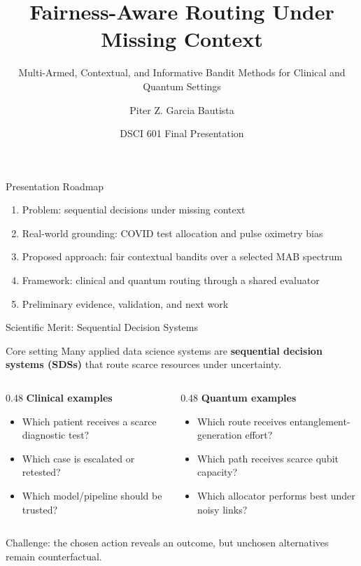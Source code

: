 \documentclass[aspectratio=169,10pt]{beamer}
\title[Fairness-Aware Routing]{Fairness-Aware Routing Under Missing Context}
\subtitle{Multi-Armed, Contextual, and Informative Bandit Methods for Clinical and Quantum Settings}
\author[P. Z. Garcia]{Piter Z. Garcia Bautista}
\institute[RIT]{Rochester Institute of Technology\\MS Data Science / Decision-Making \& Algorithmic Fairness}
\date{DSCI 601 Final Presentation}
\begin{document}
\begin{frame}
  \titlepage
\end{frame}

\begin{frame}{Presentation Roadmap}
\begin{enumerate}
    \item Problem: sequential decisions under missing context
    \item Real-world grounding: COVID test allocation and pulse oximetry bias
    \item Proposed approach: fair contextual bandits over a selected MAB spectrum
    \item Framework: clinical and quantum routing through a shared evaluator
    \item Preliminary evidence, validation, and next work
\end{enumerate}
\end{frame}

\begin{frame}{Scientific Merit: Sequential Decision Systems}
\begin{block}{Core setting}
Many applied data science systems are \textbf{sequential decision systems (SDSs)} that route scarce resources under uncertainty.
\end{block}

\vspace{0.5em}
\begin{columns}[T]
\begin{column}{0.48\textwidth}
\textbf{Clinical examples}
\begin{itemize}
    \item Which patient receives a scarce diagnostic test?
    \item Which case is escalated or retested?
    \item Which model/pipeline should be trusted?
\end{itemize}
\end{column}
\begin{column}{0.48\textwidth}
\textbf{Quantum examples}
\begin{itemize}
    \item Which route receives entanglement-generation effort?
    \item Which path receives scarce qubit capacity?
    \item Which allocator performs best under noisy links?
\end{itemize}
\end{column}
\end{columns}

\vspace{0.5em}
\alert{Challenge:} the chosen action reveals an outcome, but unchosen alternatives remain counterfactual.
\end{frame}
\end{document}
